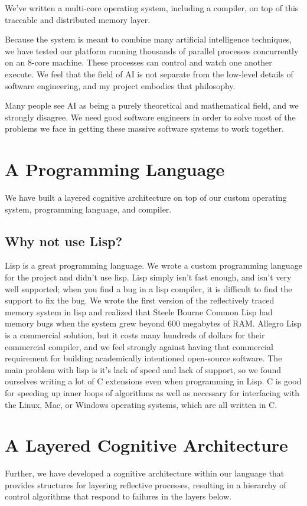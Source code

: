 We've written a multi-core operating system, including a
compiler, on top of this traceable and distributed memory layer.

Because the system is meant to combine many artificial intelligence
techniques, we have tested our platform running thousands of parallel
processes concurrently on an 8-core machine.  These processes can
control and watch one another execute.  We feel that the field of AI
is not separate from the low-level details of software engineering,
and my project embodies that philosophy.

Many people see AI as being a purely theoretical and mathematical
field, and we strongly disagree.  We need good software engineers in
order to solve most of the problems we face in getting these massive
software systems to work together.

\section{A Programming Language}

We have built a layered cognitive architecture on top of our custom
operating system, programming language, and compiler.

\subsection{Why not use Lisp?}

Lisp is a great programming language.  We wrote a custom programming
language for the project and didn't use lisp.  Lisp simply isn't fast
enough, and isn't very well supported; when you find a bug in a lisp
compiler, it is difficult to find the support to fix the bug.  We
wrote the first version of the reflectively traced memory system in
lisp and realized that Steele Bourne Common Lisp had memory bugs when
the system grew beyond 600 megabytes of RAM.  Allegro Lisp is a
commercial solution, but it costs many hundreds of dollars for their
commercial compiler, and we feel strongly against having that
commercial requirement for building academically intentioned
open-source software.  The main problem with lisp is it's lack of
speed and lack of support, so we found ourselves writing a lot of C
extensions even when programming in Lisp.  C is good for speeding up
inner loops of algorithms as well as necessary for interfacing with
the Linux, Mac, or Windows operating systems, which are all written in
C.

\section{A Layered Cognitive Architecture}

Further, we have developed a cognitive architecture within our
language that provides structures for layering reflective processes,
resulting in a hierarchy of control algorithms that respond to
failures in the layers below.

